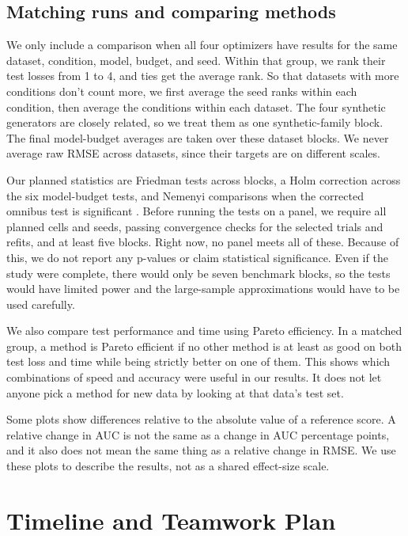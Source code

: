 \documentclass[12pt,letterpaper]{article}
\begin{document}
\subsection{Matching runs and comparing methods}\label{matching-runs-and-comparing-methods}

We only include a comparison when all four optimizers have results for the same dataset, condition, model, budget, and seed. Within that group, we rank their test losses from 1 to 4, and ties get the average rank. So that datasets with more conditions don't count more, we first average the seed ranks within each condition, then average the conditions within each dataset. The four synthetic generators are closely related, so we treat them as one synthetic-family block. The final model-budget averages are taken over these dataset blocks. We never average raw RMSE across datasets, since their targets are on different scales.

Our planned statistics are Friedman tests across blocks, a Holm correction across the six model-budget tests, and Nemenyi comparisons when the corrected omnibus test is significant \cite{demsar06}. Before running the tests on a panel, we require all planned cells and seeds, passing convergence checks for the selected trials and refits, and at least five blocks. Right now, no panel meets all of these. Because of this, we do not report any p-values or claim statistical significance. Even if the study were complete, there would only be seven benchmark blocks, so the tests would have limited power and the large-sample approximations would have to be used carefully.

We also compare test performance and time using Pareto efficiency. In a matched group, a method is Pareto efficient if no other method is at least as good on both test loss and time while being strictly better on one of them. This shows which combinations of speed and accuracy were useful in our results. It does not let anyone pick a method for new data by looking at that data's test set.

Some plots show differences relative to the absolute value of a reference score. A relative change in AUC is not the same as a change in AUC percentage points, and it also does not mean the same thing as a relative change in RMSE. We use these plots to describe the results, not as a shared effect-size scale.

\section{Timeline and Teamwork Plan}\label{timeline-and-teamwork-plan}
\end{document}
